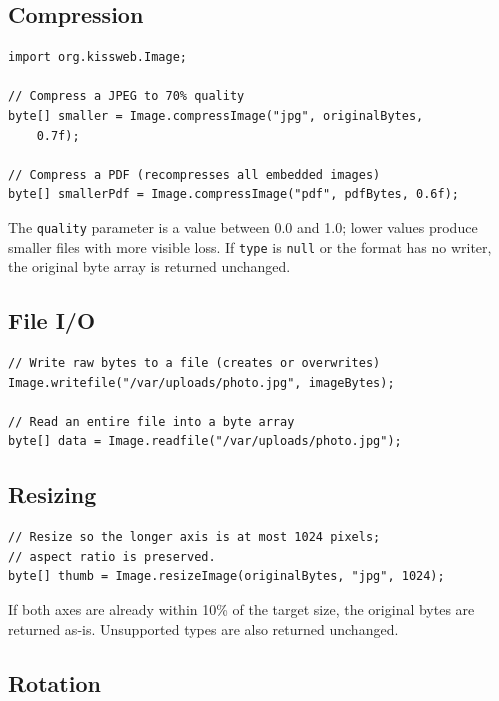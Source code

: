 \subsection{Compression}

\begin{lstlisting}[style=java]
import org.kissweb.Image;

// Compress a JPEG to 70% quality
byte[] smaller = Image.compressImage("jpg", originalBytes,
    0.7f);

// Compress a PDF (recompresses all embedded images)
byte[] smallerPdf = Image.compressImage("pdf", pdfBytes, 0.6f);
\end{lstlisting}

\noindent
The \texttt{quality} parameter is a value between 0.0 and 1.0; lower values produce smaller files with more visible loss.  If \texttt{type} is \texttt{null} or the format has no writer, the original byte array is returned unchanged.

\subsection{File I/O}

\begin{lstlisting}[style=java]
// Write raw bytes to a file (creates or overwrites)
Image.writefile("/var/uploads/photo.jpg", imageBytes);

// Read an entire file into a byte array
byte[] data = Image.readfile("/var/uploads/photo.jpg");
\end{lstlisting}

\subsection{Resizing}

\begin{lstlisting}[style=java]
// Resize so the longer axis is at most 1024 pixels;
// aspect ratio is preserved.
byte[] thumb = Image.resizeImage(originalBytes, "jpg", 1024);
\end{lstlisting}

\noindent
If both axes are already within 10\% of the target size, the original bytes are returned as-is.  Unsupported types are also returned unchanged.

\subsection{Rotation}

